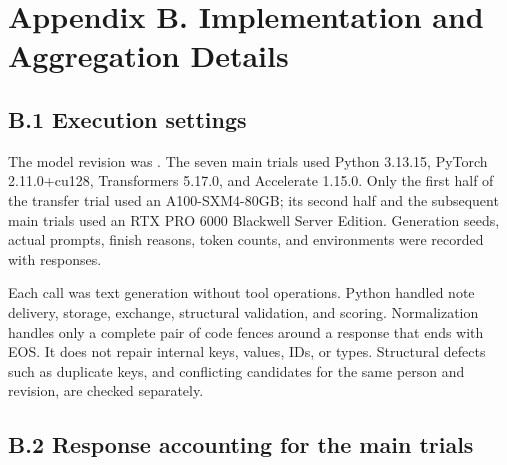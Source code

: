 \documentclass[10pt,a4paper]{article}
\begin{document}
\section{Appendix B. Implementation and Aggregation Details}\label{paper-02-appendix-b.-implementation-and-aggregation-details}

\subsection{B.1 Execution settings}\label{paper-02-b.1-execution-settings}

The model revision was \texttt{}. The seven main trials used Python 3.13.15, PyTorch 2.11.0+cu128, Transformers 5.17.0, and Accelerate 1.15.0. Only the first half of the transfer trial used an A100-SXM4-80GB; its second half and the subsequent main trials used an RTX PRO 6000 Blackwell Server Edition. Generation seeds, actual prompts, finish reasons, token counts, and environments were recorded with responses.

Each call was text generation without tool operations. Python handled note delivery, storage, exchange, structural validation, and scoring. Normalization handles only a complete pair of \texttt{} code fences around a response that ends with EOS. It does not repair internal keys, values, IDs, or types. Structural defects such as duplicate keys, and conflicting candidates for the same person and revision, are checked separately.

\Needspace{140pt}

\subsection{B.2 Response accounting for the main trials}\label{paper-02-b.2-response-accounting-for-the-main-trials}
\end{document}
